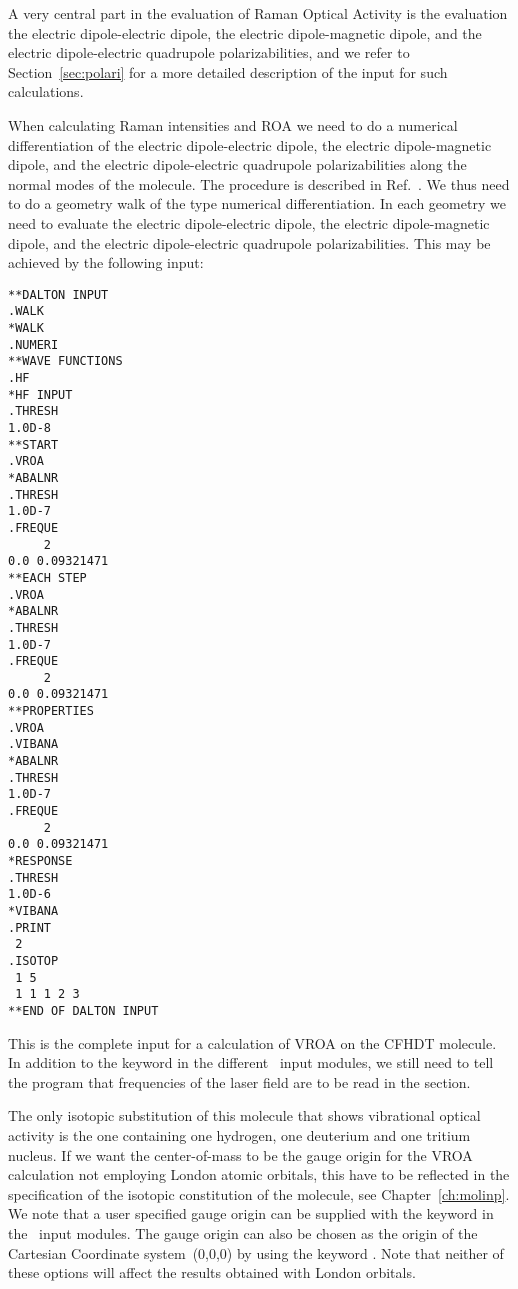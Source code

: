 A very central part in the evaluation of Raman Optical Activity is the
evaluation the electric dipole-electric dipole, the electric
dipole-magnetic dipole, and the electric dipole-electric quadrupole
polarizabilities, and we refer to Section~\ref{sec:polari} for a more
detailed description of the input for such calculations.


When calculating Raman intensities and
ROA we need to do a numerical
differentiation of the electric
dipole-electric dipole, the electric 
dipole-magnetic dipole, and the electric dipole-electric quadrupole
polarizabilities along the normal modes of the
molecule. The procedure 
is described in Ref.~\cite{thkrklbpjjofd99}. We thus need to do a
geometry walk of the type numerical differentiation. In each geometry
we need to evaluate the electric dipole-electric dipole, the electric
dipole-magnetic dipole, and the electric dipole-electric quadrupole
polarizabilities. This may be achieved by the following input:

\begin{verbatim}
**DALTON INPUT
.WALK
*WALK
.NUMERI
**WAVE FUNCTIONS
.HF
*HF INPUT
.THRESH
1.0D-8
**START
.VROA
*ABALNR
.THRESH
1.0D-7
.FREQUE
     2
0.0 0.09321471
**EACH STEP
.VROA
*ABALNR
.THRESH
1.0D-7
.FREQUE
     2
0.0 0.09321471
**PROPERTIES
.VROA
.VIBANA
*ABALNR
.THRESH
1.0D-7
.FREQUE
     2
0.0 0.09321471
*RESPONSE
.THRESH
1.0D-6
*VIBANA
.PRINT
 2
.ISOTOP
 1 5
 1 1 1 2 3
**END OF DALTON INPUT
\end{verbatim}

This is the complete input for a calculation of
VROA on the CFHDT
molecule.  
In addition to the keyword  in the different \aba\ input
modules, we still need to tell the program that frequencies of the
laser field are to be
read in the  section.

The only isotopic substitution of this molecule that shows
vibrational optical activity is the one containing one hydrogen, one
deuterium and one tritium nucleus. If we want the
center-of-mass to 
be the gauge origin for the VROA calculation not
employing London atomic orbitals, this have to be reflected in the
specification of the isotopic constitution of the molecule, see
Chapter~\ref{ch:molinp}.  
We note that a user specified gauge origin can be supplied with the
keyword  in the \aba\ input modules. The gauge origin
can also be chosen as the origin of the Cartesian Coordinate
system~(0,0,0) by using the keyword . Note that neither of
these options will affect the results obtained with London orbitals.

